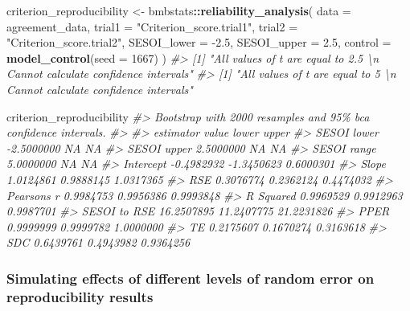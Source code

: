 \documentclass[
]{book}
\newenvironment{Shaded}{\begin{snugshade}}{\end{snugshade}}
\newcommand{\CommentTok}[1]{\textcolor[rgb]{0.56,0.35,0.01}{\textit{#1}}}
\newcommand{\DataTypeTok}[1]{\textcolor[rgb]{0.13,0.29,0.53}{#1}}
\newcommand{\DecValTok}[1]{\textcolor[rgb]{0.00,0.00,0.81}{#1}}
\newcommand{\FloatTok}[1]{\textcolor[rgb]{0.00,0.00,0.81}{#1}}
\newcommand{\KeywordTok}[1]{\textcolor[rgb]{0.13,0.29,0.53}{\textbf{#1}}}
\newcommand{\NormalTok}[1]{#1}
\newcommand{\OperatorTok}[1]{\textcolor[rgb]{0.81,0.36,0.00}{\textbf{#1}}}
\newcommand{\StringTok}[1]{\textcolor[rgb]{0.31,0.60,0.02}{#1}}
\begin{document}
\begin{Shaded}
\begin{Highlighting}[]
\NormalTok{criterion\_reproducibility <{-}}\StringTok{ }\NormalTok{bmbstats}\OperatorTok{::}\KeywordTok{reliability\_analysis}\NormalTok{(}
  \DataTypeTok{data =}\NormalTok{ agreement\_data,}
  \DataTypeTok{trial1 =} \StringTok{"Criterion\_score.trial1"}\NormalTok{,}
  \DataTypeTok{trial2 =} \StringTok{"Criterion\_score.trial2"}\NormalTok{,}
  \DataTypeTok{SESOI\_lower =} \FloatTok{{-}2.5}\NormalTok{,}
  \DataTypeTok{SESOI\_upper =} \FloatTok{2.5}\NormalTok{,}
  \DataTypeTok{control =} \KeywordTok{model\_control}\NormalTok{(}\DataTypeTok{seed =} \DecValTok{1667}\NormalTok{)}
\NormalTok{)}
\CommentTok{\#> [1] "All values of t are equal to  2.5 \textbackslash{}n Cannot calculate confidence intervals"}
\CommentTok{\#> [1] "All values of t are equal to  5 \textbackslash{}n Cannot calculate confidence intervals"}

\NormalTok{criterion\_reproducibility}
\CommentTok{\#> Bootstrap with 2000 resamples and 95\% bca confidence intervals.}
\CommentTok{\#> }
\CommentTok{\#>     estimator      value      lower      upper}
\CommentTok{\#>   SESOI lower {-}2.5000000         NA         NA}
\CommentTok{\#>   SESOI upper  2.5000000         NA         NA}
\CommentTok{\#>   SESOI range  5.0000000         NA         NA}
\CommentTok{\#>     Intercept {-}0.4982932 {-}1.3450623  0.6000301}
\CommentTok{\#>         Slope  1.0124861  0.9888145  1.0317365}
\CommentTok{\#>           RSE  0.3076774  0.2362124  0.4474032}
\CommentTok{\#>   Pearson\textquotesingle{}s r  0.9984753  0.9956386  0.9993848}
\CommentTok{\#>     R Squared  0.9969529  0.9912963  0.9987701}
\CommentTok{\#>  SESOI to RSE 16.2507895 11.2407775 21.2231826}
\CommentTok{\#>          PPER  0.9999999  0.9999782  1.0000000}
\CommentTok{\#>            TE  0.2175607  0.1670274  0.3163618}
\CommentTok{\#>           SDC  0.6439761  0.4943982  0.9364256}
\end{Highlighting}
\end{Shaded}

\hypertarget{simulating-effects-of-different-levels-of-random-error-on-reproducibility-results}{%
\subsubsection{Simulating effects of different levels of random error on reproducibility results}\label{simulating-effects-of-different-levels-of-random-error-on-reproducibility-results}}
\end{document}
